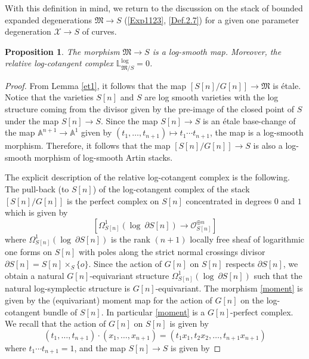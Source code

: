 \documentclass[11pt]{amsart}
\theoremstyle{plain}
\numberwithin{equation}{section}
\theoremstyle{definition}
\theoremstyle{plain}
\newtheorem{Prop}[Def]{Proposition}
\begin{document}
With this definition in mind, we return to the discussion on the stack of bounded expanded degenerations $\mathfrak M\rightarrow S$ (\ref{Exp1123}, \ref{Def.2.7}) for a given one parameter degeneration $\mathcal X\rightarrow S$ of curves. 


\smallskip


\begin{Prop}\label{rellog101}
The morphism $\mathfrak M\longrightarrow S$ is a log-smooth map. Moreover, the relative log-cotangent complex $\mathbb L^{\log}_{\mathfrak M/S}=0$. 
\end{Prop}
\begin{proof}
From Lemma \ref{et1}, it follows that the map $[S[n]/ G[n]]\longrightarrow \mathfrak M$ is \'{e}tale. Notice that the varieties $S[n]$ and $S$ are log smooth varieties with the log structure coming from the divisor given by the pre-image of the closed point of $S$ under the map $S[n]\longrightarrow S$. Since the map $S[n]\longrightarrow S$ is an \'{e}tale base-change of the map $\mathbb A^{n+1}\longrightarrow \mathbb A^1$ given by $(t_1, \dots, t_{n+1})\mapsto t_1\cdots t_{n+1}$, the map is a log-smooth morphism. Therefore, it follows that the map $[S[n]/ G[n]]\longrightarrow S$ is also a log-smooth morphism of log-smooth Artin stacks. 

The explicit description of the relative log-cotangent complex is the following. 
The pull-back (to $S[n]$) of the log-cotangent complex of the stack $[S[n]/G[n]]$ is the perfect 
complex on $S[n]$ concentrated in degrees $0$ and $1$ which is given by 
\begin{equation}\label{moment}
\left[\Omega_{S[n]}^{1}(\log ~\partial S[n])\longrightarrow \mathcal O_{S[n]}^{\oplus n}\right]
\end{equation} 
where $\Omega_{S[n]}^{1}(\log ~\partial S[n])$ is the rank $(n+1)$ locally free sheaf of logarithmic one forms on $S[n]$ with poles along the strict normal crossings divisor $\partial S[n] = S[n]\times_{S} \{o\}$.  Since the action of $G[n]$ on $S[n]$ respects $\partial S[n]$, we obtain a natural $G[n]$-equivariant structure $\Omega_{S[n]}^{1}(\log ~\partial S[n])$  such that the natural log-symplectic structure is $G[n]$-equivariant. The morphism \eqref{moment} is given by the (equivariant)  moment map for the action of $G[n]$ on the log-cotangent bundle of $S[n]$. In particular \eqref{moment} is a $G[n]$-perfect complex. We recall that the action of $G[n]$ on $S[n]$ is given by 
\begin{equation}\label{act123}
(t_1, \dots, t_{n+1})\cdot(x_1, \dots, x_{n+1})=(t_1x_1, t_2 x_2, \dots, t_{n+1}x_{n+1})
\end{equation}
where $t_1\cdots t_{n+1}=1$, and the map $S[n]\longrightarrow S$ is given by


\end{proof}
\end{document}
